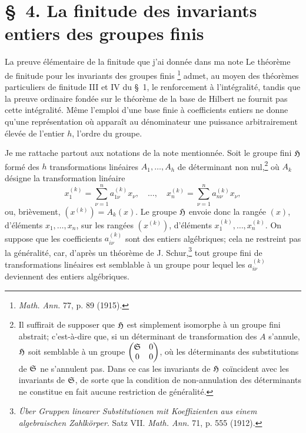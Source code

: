 \section*{\S\ 4. La finitude des invariants entiers des groupes finis}

La preuve élémentaire de la finitude que j'ai donnée dans ma note \og Le théorème de finitude pour les invariants des groupes finis \fg{}\footnote{\emph{Math. Ann.} 77, p. 89 (1915).} admet, au moyen des théorèmes particuliers de finitude III et IV du \S\ 1, le renforcement à l'intégralité, tandis que la preuve ordinaire fondée sur le théorème de la base de Hilbert ne fournit pas cette intégralité. Même l'emploi d'une base finie à coefficients entiers ne donne qu'une représentation où apparaît au dénominateur une puissance arbitrairement élevée de l'entier $h$, l'ordre du groupe.

Je me rattache partout aux notations de la note mentionnée. Soit le groupe fini $\mathfrak H$ formé des $h$ transformations linéaires $A_1,\ldots,A_h$ de déterminant non nul,\footnote{Il suffirait de supposer que $\mathfrak H$ est simplement isomorphe à un groupe fini abstrait; c'est-à-dire que, si un déterminant de transformation des $A$ s'annule, $\mathfrak H$ soit semblable à un groupe $\begin{pmatrix}\mathfrak S&0\\0&0\end{pmatrix}$, où les déterminants des substitutions de $\mathfrak S$ ne s'annulent pas. Dans ce cas les invariants de $\mathfrak H$ coïncident avec les invariants de $\mathfrak S$, de sorte que la condition de non-annulation des déterminants ne constitue en fait aucune restriction de généralité.} où $A_k$ désigne la transformation linéaire
\[
        x_1^{(k)}=\sum_{\nu=1}^{n}a_{1\nu}^{(k)}x_\nu,
        \quad\ldots,\quad
        x_n^{(k)}=\sum_{\nu=1}^{n}a_{n\nu}^{(k)}x_\nu,
\]
ou, brièvement, $(x^{(k)})=A_k(x)$. Le groupe $\mathfrak H$ envoie donc la rangée $(x)$, d'éléments $x_1,\ldots,x_n$, sur les rangées $(x^{(k)})$, d'éléments $x_1^{(k)},\ldots,x_n^{(k)}$. On suppose que les coefficients $a_{i\nu}^{(k)}$ sont des entiers algébriques; cela ne restreint pas la généralité, car, d'après un théorème de J. Schur,\footnote{\emph{Über Gruppen linearer Substitutionen mit Koeffizienten aus einem algebraischen Zahlkörper}. Satz VII. \emph{Math. Ann.} 71, p. 555 (1912).} tout groupe fini de transformations linéaires est semblable à un groupe pour lequel les $a_{i\nu}^{(k)}$ deviennent des entiers algébriques.

